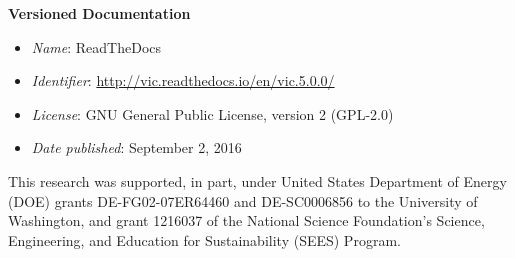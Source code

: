 \documentclass[gmd, manuscript]{copernicus}
\begin{document}
{\bf Versioned Documentation}

\begin{itemize}
	\item \textit{Name}: ReadTheDocs
	\item \textit{Identifier}: \url{http://vic.readthedocs.io/en/vic.5.0.0/}
	\item \textit{License}: GNU General Public License, version 2 (GPL-2.0)
	\item \textit{Date published}: September 2, 2016
\end{itemize}



\begin{acknowledgements}
  This research was supported, in part, under United States Department of Energy (DOE) grants DE-FG02-07ER64460 and DE-SC0006856 to the University of Washington, and grant 1216037 of the National Science Foundation's Science, Engineering, and Education for Sustainability (SEES) Program.
\end{acknowledgements}




%
%
%





\end{document}
